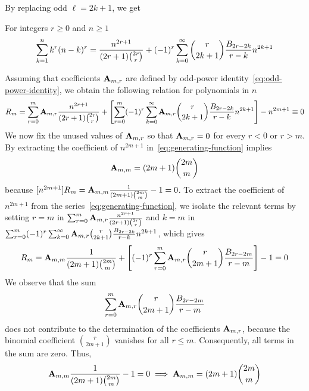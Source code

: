 By replacing odd $\ell = 2k+1$, we get
\begin{proposition}
    For integers $r \geq 0$ and $n \geq 1$
    \label{prop:bivariate-faulhabers-formula}
    \begin{align*}
        \sum_{k=1}^{n} k^{r} (n-k)^{r}
        = \frac{n^{2r+1}}{(2r+1) \binom{2r}r}
        + (-1)^r \sum_{k=0}^{\infty} \binom{r}{2k+1} \frac{{B}\sb{2r-2k}}{r-k} n^{2k+1}
    \end{align*}
\end{proposition}
Assuming that coefficients ${\mathbf{A}} \sb{m,r}$ are defined
by odd-power identity~\eqref{eq:odd-power-identity},
we obtain the following relation for polynomials in $n$
\begin{align}
    \label{eq:generating-function}
    R_{m} = \sum_{r=0}^{m} {\mathbf{A}} \sb{m,r} \frac{n^{2r+1}}{(2r+1) \binom{2r}{r}}
    + \left[ \sum_{r=0}^{m} (-1)^r \sum_{k=0}^{\infty} {\mathbf{A}} \sb{m,r} \binom{r}{2k+1} \frac{{B}\sb{2r-2k}}{r-k} n^{2k+1} \right]
    - n^{2m+1} \equiv 0
\end{align}
We now fix the unused values of ${\mathbf{A}} \sb{m,r}$ so that ${\mathbf{A}} \sb{m,r} = 0$ for every $r < 0$ or $r > m$.
By extracting the coefficient of $n^{2m+1}$ in~\eqref{eq:generating-function} implies
\begin{align*}
    {\mathbf{A}} \sb{m,m} = (2m+1)\binom{2m}{m}
\end{align*}
because $[n^{2m+1}]R_m = {\mathbf{A}} \sb{m,m} \frac{1}{(2m+1) \binom{2m}{m}} - 1 = 0$.
To extract the coefficient of $n^{2m+1}$ from the series~\eqref{eq:generating-function},
we isolate the relevant terms by setting $r = m$ in $\sum_{r=0}^{m} {\mathbf{A}} \sb{m,r} \frac{n^{2r+1}}{(2r+1) \binom{2r}{r}}$
and $k = m$ in $\sum_{r=0}^{m} (-1)^r \sum_{k=0}^{\infty} {\mathbf{A}} \sb{m,r} \binom{r}{2k+1} \frac{{B}\sb{2r-2k}}{r-k} n^{2k+1}$,
which gives
\begin{align*}
[n^{2m+1}]
    R_{m}
    = \coeffA{m}{m} \frac{1}{(2m+1) \binom{2m}{m}}
    + \left[ (-1)^r \sum_{r=0}^{m} \coeffA{m}{r} \binom{r}{2m+1} \frac{\bernoulli{2r-2m}}{r-m} \right]
    - 1 = 0
\end{align*}
We observe that the sum
\begin{align*}
    \sum_{r=0}^{m} {\mathbf{A}} \sb{m,r} \binom{r}{2m+1} \frac{{B}\sb{2r-2m}}{r-m}
\end{align*}
does not contribute to the determination of the coefficients ${\mathbf{A}} \sb{m,r}$, because the binomial coefficient
$\binom{r}{2m+1}$ vanishes for all $r \leq m$.
Consequently, all terms in the sum are zero.
Thus,
\begin{align*}
    {\mathbf{A}} \sb{m,m} \frac{1}{(2m+1) \binom{2m}{m}}  - 1 = 0 \implies {\mathbf{A}} \sb{m,m} = (2m+1) \binom{2m}{m}
\end{align*}
